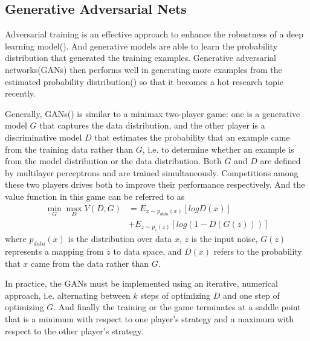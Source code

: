 \subsection{Generative Adversarial Nets}
Adversarial training is an effective approach to enhance the robustness of a deep learning model(\citealp{bai2021recent}). And generative models are able to learn the probability distribution that generated the training examples. Generative adversarial networks(GANs) then performs well in generating more examples from the estimated probability distribution(\citealp{goodfellow2020generative}) so that it becomes a hot research topic recently.

Generally, GANs(\citealp{10.5555/2969033.2969125}) is similar to a minimax two-player game: one is a generative model $G$ that captures the data distribution, and the other player is a discriminative model $D$ that estimates the probability that an example came from the training data rather than $G$, i.e. to determine whether an example is from the model distribution or the data distribution. Both $G$ and $D$ are defined by multilayer perceptrons and are trained simultaneously. Competitions among these two players drives both to improve their performance respectively. And the value function in this game can be referred to as
\begin{equation}
\begin{split}
\mathop{min}\limits_{G}\mathop{max}\limits_{D}V(D,G)&=E_{x\sim p_{data}(x)}[log D(x)]\\ &+E_{z\sim p_{z}(z)}[log (1-D(G(z)))]
\end{split}
\end{equation}
where $p_{data}(x)$ is the distribution over data $x$, $z$ is the input noise, $G(z)$ represents a mapping from $z$ to data space, and $D(x)$ refers to the probability that $x$ came from the data rather than $G$.

In practice, the GANs must be implemented using an iterative, numerical approach, i.e. alternating between $k$ steps of optimizing $D$ and one step of optimizing $G$. And finally the training or the game terminates at a saddle point that is a minimum with respect to one player's strategy and a maximum with respect to the other player's strategy.

